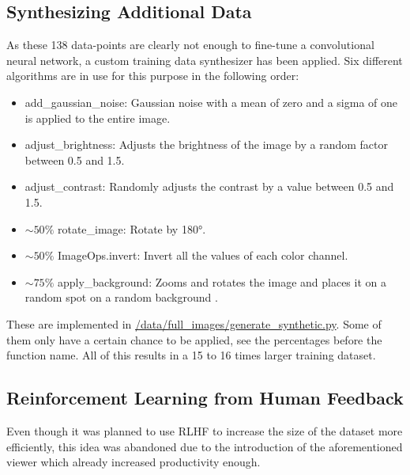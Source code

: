 \documentclass[a4paper,11pt]{report}
\begin{document}
            \subsection{Synthesizing Additional Data}
                As these 138 data-points are clearly not enough to fine-tune a convolutional neural network, a custom training data synthesizer has been applied. Six different algorithms are in use for this purpose in the following order:
                \begin{itemize}
                    \item add\_gaussian\_noise: Gaussian noise \cite{gaussian-noise} with a mean of zero and a sigma of one is applied to the entire image.
                    \item adjust\_brightness: Adjusts the brightness of the image by a random factor between 0.5 and 1.5.
                    \item adjust\_contrast: Randomly adjusts the contrast by a value between 0.5 and 1.5.
                    \item $\sim 50\%$ rotate\_image: Rotate by 180°.
                    \item $\sim 50\%$ ImageOps.invert: Invert all the values of each color channel.
                    \item $\sim 75\%$ apply\_background: Zooms and rotates the image and places it on a random spot on a random background \cite{indoorCVPR_09}.
                \end{itemize}
                These are implemented in \href{https://github.com/lenamerkli/ingredient-scanner/blob/main/data/full_images/generate_synthetic.py}{/data/full\_images/generate\_synthetic.py}. Some of them only have a certain chance to be applied, see the percentages before the function name. All of this results in a 15 to 16 times larger training dataset.
                
            \subsection{Reinforcement Learning from Human Feedback}
                Even though it was planned to use RLHF to increase the size of the dataset more efficiently, this idea was abandoned due to the introduction of the aforementioned viewer which already increased productivity enough.
                
                
\end{document}

